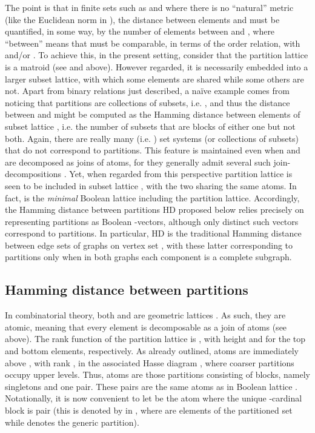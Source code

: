\documentclass[a4paper,10pt]{article}
\begin{document}
The point is that in finite sets such as  and  where there is no ``natural'' metric (like the Euclidean norm in ), the distance between elements
 and  must be quantified, in some way, by the number of elements  between  and , where ``between'' means that  must be comparable, in terms of the order relation, with
 and/or . To achieve this, in the present setting, consider that the partition lattice  is a matroid (see \cite{Aigner79,Stern99} and above). However
regarded, it is necessarily embedded into a larger subset lattice, with which some elements are shared while some others are not. Apart from binary relations just described, a na\"ive
example comes from noticing that partitions  are collections of subsets, i.e. , and thus the distance between  and  might be computed as the Hamming distance
 between elements of subset lattice , i.e. the number of subsets  that are blocks of either one but not both. Again, there are really many (i.e.
) set systems (or collections  of subsets) that do not correspond to partitions. This feature is maintained even when  and  are decomposed
as joins of atoms, for they generally admit several such join-decompositions \cite[Chapter II]{Aigner79}. Yet, when regarded from this perspective partition lattice
 is seen to be included in subset lattice , with the two sharing the same  atoms. In fact,  is the \textit{minimal}
Boolean lattice including the partition lattice. Accordingly, the Hamming distance between partitions HD proposed below relies precisely on representing partitions as Boolean
-vectors, although only  distinct such vectors correspond to partitions. In particular, HD is the traditional Hamming distance 
between edge sets  of graphs on vertex set , with these latter corresponding to partitions only when in both graphs  each component is a complete
subgraph.

\subsection{Hamming distance between partitions}
In combinatorial theory, both  and  are geometric lattices \cite[p. 54]{Aigner79}. As such, they are atomic, meaning that every
element is decomposable as a join of atoms (see above). The rank function  of the partition lattice is , with height
 and  for the top and bottom elements, respectively. As already outlined, atoms are immediately above , with rank , in the associated
Hasse diagram \cite[p. 889]{Meila2007}, where coarser partitions occupy upper levels. Thus, atoms are those partitions consisting of  blocks, namely  singletons and one
pair. These  pairs  are the same atoms as in Boolean lattice . Notationally, it is now convenient to let 
be the atom where the unique -cardinal block is pair  (this is denoted by  in \cite[p. 150]{LeclercMondjardetLatticialConsensus}, where  are elements of
the partitioned set while  denotes the generic partition).
\end{document}

